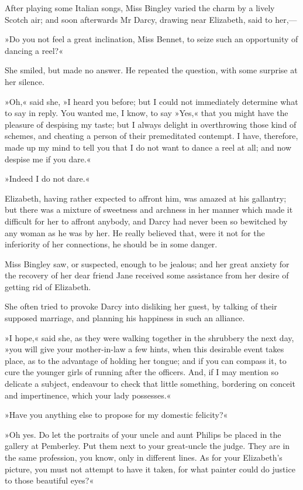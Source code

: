 After playing some Italian songs, Miss Bingley varied the charm by a lively Scotch air; and soon afterwards Mr Darcy, drawing near Elizabeth, said to her,—

»Do you not feel a great inclination, Miss Bennet, to seize such an opportunity of dancing a reel?«

She smiled, but made no answer. He repeated the question, with some surprise at her silence.

»Oh,« said she, »I heard you before; but I could not immediately determine what to say in reply. You wanted me, I know, to say »Yes,« that you might have the pleasure of despising my taste; but I always delight in overthrowing those kind of schemes, and cheating a person of their premeditated contempt. I have, therefore, made up my mind to tell you that I do not want to dance a reel at all; and now despise me if you dare.«

»Indeed I do not dare.«

Elizabeth, having rather expected to affront him, was amazed at his gallantry; but there was a mixture of sweetness and archness in her manner which made it difficult for her to affront anybody, and Darcy had never been so bewitched by any woman as he was by her. He really believed that, were it not for the inferiority of her connections, he should be in some danger.

Miss Bingley saw, or suspected, enough to be jealous; and her great anxiety for the recovery of her dear friend Jane received some assistance from her desire of getting rid of Elizabeth.

She often tried to provoke Darcy into disliking her guest, by talking of their supposed marriage, and planning his happiness in such an alliance.

»I hope,« said she, as they were walking together in the shrubbery the next day, »you will give your mother-in-law a few hints, when this desirable event takes place, as to the advantage of holding her tongue; and if you can compass it, to cure the younger girls of running after the officers. And, if I may mention so delicate a subject, endeavour to check that little something, bordering on conceit and impertinence, which your lady possesses.«

»Have you anything else to propose for my domestic felicity?«

»Oh yes. Do let the portraits of your uncle and aunt Philips be placed in the gallery at Pemberley. Put them next to your great-uncle the judge. They are in the same profession, you know, only in different lines. As for your Elizabeth's picture, you must not attempt to have it taken, for what painter could do justice to those beautiful eyes?«

